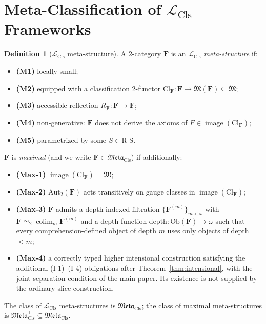 \documentclass[11pt]{article}
\theoremstyle{plain}
\theoremstyle{definition}
\newtheorem{definition}[theorem]{Definition}
\newcommand{\RS}{\mathrm{R\text{-}S}}
\newcommand{\fM}{\mathfrak{M}}
\newcommand{\Meta}{\mathfrak{Meta}}
\newcommand{\LCls}{\mathcal{L}_{\mathrm{Cls}}}
\newcommand{\Ob}{\mathrm{Ob}}
\newcommand{\Cl}{\mathrm{Cl}}
\DeclareMathOperator{\colim}{colim}
\DeclareMathOperator{\image}{image}
\begin{document}
\section{\texorpdfstring{Meta-Classification of $\LCls$ Frameworks}{Meta-Classification of L\_Cls Frameworks}}\label{sec:meta}

\begin{definition}[$\LCls$ meta-structure]\label{def:meta}
A $2$-category $\mathbf{F}$ is an \emph{$\LCls$ meta-structure} if:
\begin{itemize}
\item \textbf{(M1)} locally small;
\item \textbf{(M2)} equipped with a classification $2$-functor $\Cl_{\mathbf{F}} : \mathbf{F} \to \fM(\mathbf{F}) \subseteq \fM$;
\item \textbf{(M3)} accessible reflection $R_{\mathbf{F}} : \mathbf{F} \to \mathbf{F}$;
\item \textbf{(M4)} non-generative: $\mathbf{F}$ does not derive the axioms of $F \in \image(\Cl_{\mathbf{F}})$;
\item \textbf{(M5)} parametrized by some $S \in \RS$.
\end{itemize}
$\mathbf{F}$ is \emph{maximal} (and we write $\mathbf{F} \in \Meta_{\mathrm{Cls}}^{\top}$) if additionally:
\begin{itemize}
\item \textbf{(Max-1)} $\image(\Cl_{\mathbf{F}}) = \fM$;
\item \textbf{(Max-2)} $\mathrm{Aut}_2(\mathbf{F})$ acts transitively on gauge classes in $\image(\Cl_{\mathbf{F}})$;
\item \textbf{(Max-3)} $\mathbf{F}$ admits a depth-indexed filtration $\{\mathbf{F}^{(m)}\}_{m < \omega}$ with $\mathbf{F} \simeq_2 \colim_m \mathbf{F}^{(m)}$ and a depth function $\mathrm{depth} : \Ob(\mathbf{F}) \to \omega$ such that every comprehension-defined object of depth $m$ uses only objects of depth $< m$;
\item \textbf{(Max-4)} a correctly typed higher intensional construction satisfying the additional (I-1)--(I-4) obligations after Theorem~\ref{thm:intensional}, with the joint-separation condition of the main paper. Its existence is not supplied by the ordinary slice construction.
\end{itemize}
The class of $\LCls$ meta-structures is $\Meta_{\mathrm{Cls}}$; the class of maximal meta-structures is $\Meta_{\mathrm{Cls}}^{\top} \subseteq \Meta_{\mathrm{Cls}}$.
\end{definition}
\end{document}
